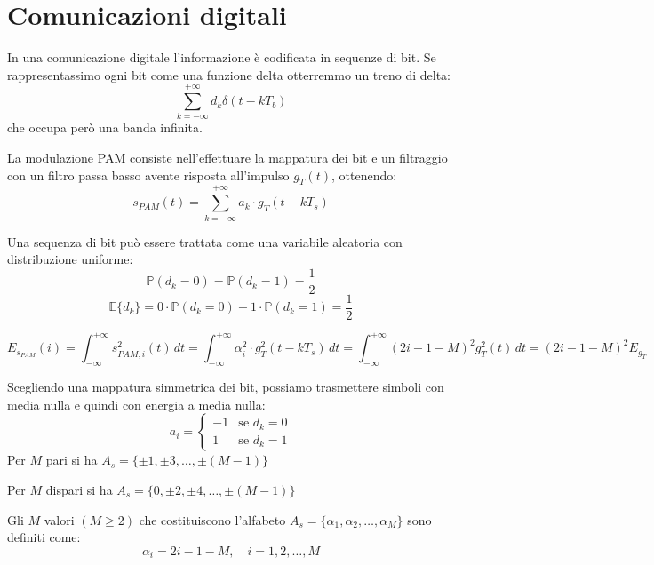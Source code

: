 
\section*{Comunicazioni digitali}

\begin{adjustwidth*}{-2.3cm}{-2cm}
    \begin{center}
        
    \end{center}
\end{adjustwidth*}


In una comunicazione digitale l'informazione è codificata in sequenze di bit. Se rappresentassimo ogni bit come una funzione delta otterremmo un treno di delta:
\[
    \sum_{k=-\infty}^{+\infty} d_k \delta(t - kT_b)
\]
che occupa però una banda infinita.

La modulazione PAM consiste nell'effettuare la mappatura dei bit e un filtraggio con un filtro passa basso avente risposta all'impulso \( g_T(t) \), ottenendo:
\[ s_{PAM}(t) = \sum_{k=-\infty}^{+\infty} a_k\cdot g_T(t - kT_s) \]

Una sequenza di bit può essere trattata come una variabile aleatoria con distribuzione uniforme:
\[
    \mathbb{P}(d_k = 0) = \mathbb{P}(d_k = 1) = \frac{1}{2}
\]
\[
    \mathbb{E}\{d_k\} = 0\cdot \mathbb{P}(d_k = 0) + 1\cdot \mathbb{P}(d_k = 1) = \frac{1}{2}
\]

\[
    E_{s_{PAM}}(i) = \int_{-\infty}^{+\infty} s_{PAM, i}^2(t) \, dt =  \int_{-\infty}^{+\infty} \alpha_i^2 \cdot g_T^2(t - kT_s) \, dt = \int_{-\infty}^{+\infty} (2i - 1 - M)^2 g_T^2(t) \, dt = (2i - 1 - M)^2 E_{g_T}
\]

Scegliendo una mappatura simmetrica dei bit, possiamo trasmettere simboli con media nulla e quindi con energia a media nulla:
\[
    a_i =
    \begin{cases}
        -1 & \text{se } d_k = 0 \\
        1  & \text{se } d_k = 1
    \end{cases}
\]
Per \( M \) pari si ha \( A_s = \{ \pm 1, \pm 3, \ldots, \pm (M-1) \} \)

Per \( M \) dispari si ha \( A_s = \{ 0, \pm 2, \pm 4, \ldots, \pm (M-1) \} \)


Gli \( M \) valori \( (M \geq 2) \) che costituiscono l'alfabeto \( A_s = \{ \alpha_1, \alpha_2, \ldots, \alpha_M \} \) sono definiti come:
\[ \alpha_i = 2i - 1 - M, \quad i = 1, 2, \ldots, M \]




